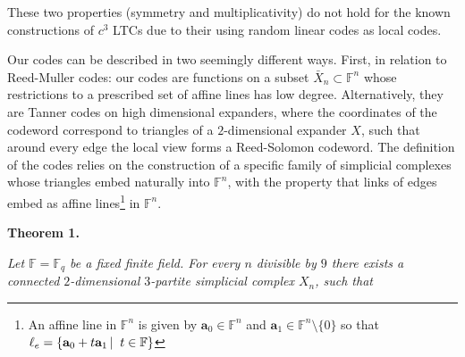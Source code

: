 These two properties (symmetry and multiplicativity) do not hold for the known constructions of $c^{3}$ LTCs due to their using random linear codes as local codes.\par




Our codes can be described in two seemingly different ways. First, in relation to Reed-Muller codes: our codes are functions on a subset $\bar{X}_{n}\subset\mathbb{F}^{n}$ whose restrictions to a prescribed set of affine lines has low degree. Alternatively, they are Tanner codes on high dimensional expanders, where the coordinates of the codeword correspond to triangles of a $2$-dimensional expander $X$, such that around every edge the local view forms a Reed-Solomon codeword.
The definition of the codes relies on the construction of a specific family of simplicial complexes whose triangles embed naturally into $\mathbb{F}^{n}$, with the property that links of edges embed as affine lines\footnote{An affine line in $\mathbb{F}^{n}$ is given by $\mathbf{a}_{0}\in\mathbb{F}^{n}$ and $\mathbf{a}_{1}\in\mathbb{F}^{n}\setminus\{0\}$ so that $\ell_{e}=\left\{\mathbf{a}_{0}+t\mathbf{a}_{1}\left|\;\vphantom{\mathbf{a}_{0}+t\mathbf{a}_{1}t\in\mathbb{F}}\right.t\in\mathbb{F}\right\}$} in $\mathbb{F}^{n}$.\par





\par\medskip\noindent\textbf{
\textbf{Theorem 1}\textbf{.}
}\par



\emph{Let $\mathbb{F}=\mathbb{F}_{q}$ be a fixed finite field. For every $n$ divisible by $9$ there exists a connected $2$-dimensional $3$-partite simplicial complex $X_{n}$, such that}\par


